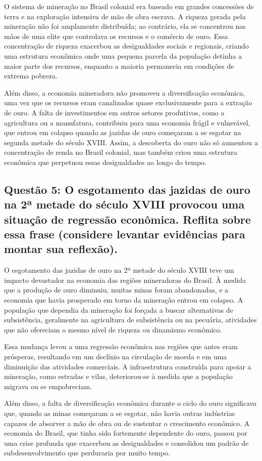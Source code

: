 \documentclass[a4paper,12pt]{article}[abntex2]
\begin{document}
O sistema de mineração no Brasil colonial era baseado em grandes concessões de terra e na exploração intensiva de mão de obra escrava. A riqueza gerada pela mineração não foi amplamente distribuída; ao contrário, ela se concentrou nas mãos de uma elite que controlava os recursos e o comércio de ouro. Essa concentração de riqueza exacerbou as desigualdades sociais e regionais, criando uma estrutura econômica onde uma pequena parcela da população detinha a maior parte dos recursos, enquanto a maioria permanecia em condições de extrema pobreza.

Além disso, a economia mineradora não promoveu a diversificação econômica, uma vez que os recursos eram canalizados quase exclusivamente para a extração de ouro. A falta de investimentos em outros setores produtivos, como a agricultura ou a manufatura, contribuiu para uma economia frágil e vulnerável, que entrou em colapso quando as jazidas de ouro começaram a se esgotar na segunda metade do século XVIII. Assim, a descoberta do ouro não só aumentou a concentração de renda no Brasil colonial, mas também criou uma estrutura econômica que perpetuou essas desigualdades ao longo do tempo.

\subsection{\textbf{Questão 5: O esgotamento das jazidas de ouro na 2ª metade do século XVIII provocou uma situação de regressão econômica. Reflita sobre essa frase (considere levantar evidências para montar sua reflexão).}}

O esgotamento das jazidas de ouro na 2ª metade do século XVIII teve um impacto devastador na economia das regiões mineradoras do Brasil. À medida que a produção de ouro diminuiu, muitas minas foram abandonadas, e a economia que havia prosperado em torno da mineração entrou em colapso. A população que dependia da mineração foi forçada a buscar alternativas de subsistência, geralmente na agricultura de subsistência ou na pecuária, atividades que não ofereciam o mesmo nível de riqueza ou dinamismo econômico.

Essa mudança levou a uma regressão econômica nas regiões que antes eram prósperas, resultando em um declínio na circulação de moeda e em uma diminuição das atividades comerciais. A infraestrutura construída para apoiar a mineração, como estradas e vilas, deteriorou-se à medida que a população migrava ou se empobreciam.

Além disso, a falta de diversificação econômica durante o ciclo do ouro significava que, quando as minas começaram a se esgotar, não havia outras indústrias capazes de absorver a mão de obra ou de sustentar o crescimento econômico. A economia do Brasil, que tinha sido fortemente dependente do ouro, passou por uma crise profunda que exacerbou as desigualdades e consolidou um padrão de subdesenvolvimento que perduraria por muito tempo.
\end{document}
